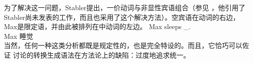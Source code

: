 
\eal
{}
\zl
为了解决这一问题，Stabler提出，一价动词与非显性宾语组合（参见 \citet[, 124]{Veenstra98a}，他引用了Stabler尚未发表的工作，而且也采用了这个解决方法）。空宾语在动词的右边，Max是限定语，并由此被排列在中动词的左边。
\ea
\label{Beispiel-leeres-Element-intransitive-Verben}
\gll Max sleeps \_.\\
     Max 睡觉 \\
\z
当然，任何一种这类分析都既是规定性的，也是完全特设的。而且，它恰巧可以佐证 \citet[\S~2.1.2]{CJ2005a}讨论的转换生成语法在方法论上的缺陷：过度地追求统一。

